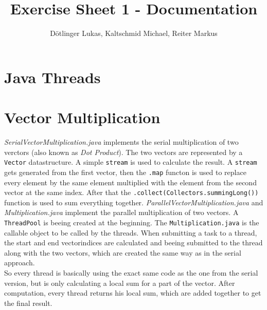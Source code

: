 \documentclass{article}
\begin{document}
	\title{Exercise Sheet 1 - Documentation}
	\date{}
	\author{Dötlinger Lukas, Kaltschmid Michael, Reiter Markus}
	
	\maketitle

	
	\section{Java Threads}
		
	
	\section{Vector Multiplication}
		\textit{SerialVectorMultiplication.java} implements the serial multiplication of two verctors (also known as \textit{Dot Product}). The two vectors are represented by a \texttt{Vector} datastructure. A simple \texttt{stream} is used to calculate the result. A \texttt{stream} gets generated from the first vector, then the \texttt{.map} functon is used to replace every element by the same element multiplied with the element from the second vector at the same index. After that the \texttt{.collect(Collectors.summingLong())} function is used to sum everything together.\bigbreak
		\textit{ParallelVectorMultiplication.java} and \textit{Multiplication.java} implement the parallel multiplication of two vectors. A \texttt{ThreadPool} is beeing created at the beginning. The \texttt{Multiplication.java} is the callable object to be called by the threads. When submitting a task to a thread, the start and end vectorindices are calculated and beeing submitted to the thread along with the two vectors, which are created the same way as in the serial approach.\\ 
		So every thread is basically using the exact same code as the one from the serial version, but is only calculating a local sum for a part of the vector.
		After computation, every thread returns his local sum, which are added together to get the final result.
		
		
	
\end{document}
